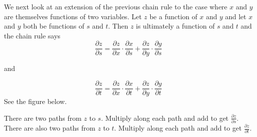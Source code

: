 \documentclass[handout]{ximera}
\begin{document}
We next look at an extension of the previous chain rule to the case  
where $x$ and $y$ are themselves functions of two variables.
Let $z$ be a function of $x$ and $y$ and let $x$ and $y$ both be 
functions of $s$ and $t$.  Then $z$ is ultimately a function of $s$ and $t$ and 
the chain rule says
\[
\frac{\partial z}{\partial s} = \frac{\partial z}{\partial x} \cdot \frac{\partial x}{\partial s} + \frac{\partial z}{\partial y} \cdot \frac{\partial y}{\partial s}
\]
\begin{center} 
and 
\end{center}
\[
\frac{\partial z}{\partial t} = \frac{\partial z}{\partial x} \cdot \frac{\partial x}{\partial t} + \frac{\partial z}{\partial y} \cdot \frac{\partial y}{\partial t} 
\]
See the figure below.
\begin{image}
\end{image}
There are two paths from $z$ to $s$. Multiply along each path and 
add to get $\frac{\partial z}{\partial s}$.
There are also two paths from $z$ to $t$. Multiply along each path and 
add to get $\frac{\partial z}{\partial t}$.
\end{document}
